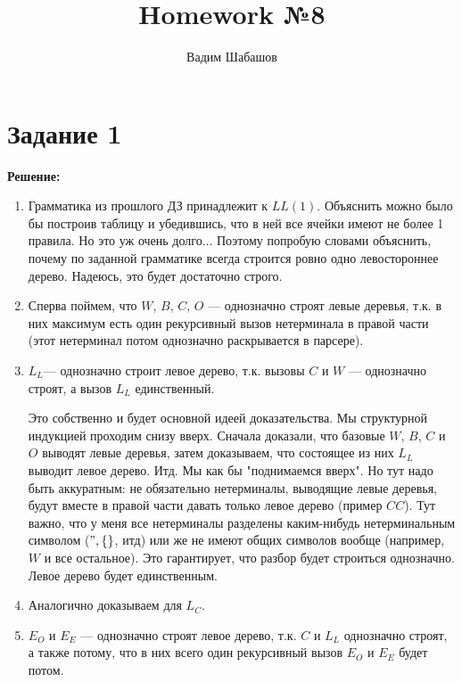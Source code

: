 \documentclass{article}
\title{Homework №8}
\author{Вадим Шабашов}
\date{}
\begin{document}
	
	\maketitle
	
	\section*{Задание 1}
	
	{\bfseries }
	
	\begin{center}
		\textbf{Решение:}
	\end{center}

\begin{enumerate}
		\item Грамматика из прошлого ДЗ принадлежит к $LL(1)$. Объяснить можно было бы построив таблицу и убедившись, что в ней все ячейки имеют не более 1 правила. Но это уж очень долго... Поэтому попробую словами объяснить, почему по заданной грамматике всегда строится ровно одно левостороннее дерево. Надеюсь, это будет достаточно строго.
		
		\item Сперва поймем, что $W$, $B$, $C$, $O$ --- однозначно строят левые деревья, т.к. в них максимум есть один рекурсивный вызов нетерминала в правой части (этот нетерминал потом однозначно раскрывается в парсере).
		
		\item $L_L$--- однозначно строит левое дерево, т.к. вызовы $C$ и $W$ --- однозначно строят, а вызов $L_L$ единственный.
		
		Это собственно и будет основной идеей доказательства. Мы структурной индукцией проходим снизу вверх. Сначала доказали, что базовые $W$, $B$, $C$ и $O$ выводят левые деревья, затем доказываем, что состоящее из них $L_L$ выводит левое дерево. Итд. Мы как бы "поднимаемся вверх". Но тут надо быть аккуратным: не обязательно нетерминалы, выводящие левые деревья, будут вместе в правой части давать только левое дерево (пример $CC$). Тут важно, что у меня все нетерминалы разделены каким-нибудь нетерминальным символом ($",\{\}$, итд) или же не имеют общих символов вообще (например, $W$ и все остальное). Это гарантирует, что разбор будет строиться однозначно. Левое дерево будет единственным. 
		
		\item Аналогично доказываем для $L_C$.
		
		
		\item $E_O$ и $E_E$ --- однозначно строят левое дерево, т.к. $C$ и $L_L$ однозначно строят, а также потому, что в них всего один рекурсивный вызов $E_O$ и $E_E$ будет потом.
		

\end{enumerate}
\end{document}
